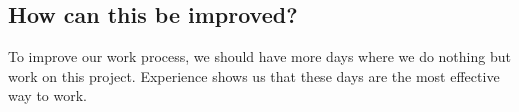 \documentclass[11pt,a4paper]{report}
\begin{document}
\subsection{How can this be improved?}
To improve our work process, we should have more days where we do nothing but work on this project. Experience shows us that these days are the most effective way to work.


%
%
\end{document}
